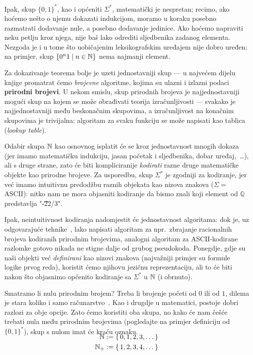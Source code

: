 Ipak, skup $\{0,1\}^*$, kao i općeniti $\Sigma^*$, matematički je nespretan; recimo, ako hoćemo nešto o njemu dokazati indukcijom, moramo u koraku posebno razmatrati dodavanje nule, a posebno dodavanje jedinice. Ako hoćemo napraviti neku petlju kroz njega, nije baš lako odrediti sljedbenika zadanog elementa. Nezgoda je i u tome što uobičajenim leksikografskim uređajem nije dobro uređen: na primjer, skup $\{0^n1\mid n\in{\mathbb N}\}$ nema najmanji element.

Za dokazivanje teorema bolje je uzeti jednostavniji skup --- u najvećem dijelu knjige promatrat ćemo \emph{brojevne} algoritme, kojima su ulazni i izlazni podaci \textbf{prirodni brojevi}. U nekom smislu, skup prirodnih brojeva je najjednostavniji mogući skup na kojem se može obrađivati teorija izračunljivosti --- svakako je najjednostavniji među beskonačnim skupovima, a izračunljivost na konačnim skupovima je trivijalna: algoritam za svaku funkciju se može napisati kao tablica (\emph{lookup table}).

Odabir skupa ${\mathbb N}$ kao osnovnog isplatit će se kroz jednostavnost mnogih dokaza (jer imamo matematičku indukciju, jasan početak i sljedbenika, dobar uređaj,~\ldots), ali s druge strane, zato će biti kompliciranije \emph{kodirati} razne druge matematičke objekte kao prirodne brojeve. Za usporedbu, skup $\Sigma^*$ je zgodniji za kodiranje, jer već imamo intuitivnu predodžbu raznih objekata kao nizova znakova ($\Sigma=$ ASCII\@): nitko nam ne mora objasniti kodiranje da bismo znali koji element od $\mathbb Q$ predstavlja "\t{-22/3}".

Ipak, neintuitivnost kodiranja nadomjestit će jednostavnost algoritama: dok je, uz odgovarajuće tehnike~\cite{posav}, lako napisati algoritam za npr.\ zbrajanje racionalnih brojeva kodiranih prirodnim brojevima, analogni algoritam za ASCII-kodirane razlomke gotovo nikada ne stigne dalje od grubog pseudokoda. Ponegdje, gdje su naši objekti već \emph{definirani} kao nizovi znakova (najvažniji primjer su formule logike prvog reda), koristit ćemo njihovu jezičnu reprezentaciju, ali to će biti nakon što objasnimo općenito kodiranje sa $\Sigma^*$ u ${\mathbb N}$ (i obrnuto).

Smatramo li nulu prirodnim brojem? Treba li brojenje početi od $0$ ili od $1$, dilema je stara koliko i samo računarstvo~\cite{note:EWD831}. Kao i drugdje u matematici, postoje dobri razlozi za obje opcije. Zato ćemo koristiti oba skupa, no kako će nam češće trebati nula među prirodnim brojevima (pogledajte na primjer definiciju od $\{0,1\}^*$), skup s nulom imat će kraću oznaku.
\begin{align}
    \SwapAboveDisplaySkip
\N&:=\{\,0,1,2,3,\dotsc\}\\
\N_+&:=\{\,1,2,3,4,\dotsc\}
\end{align}

